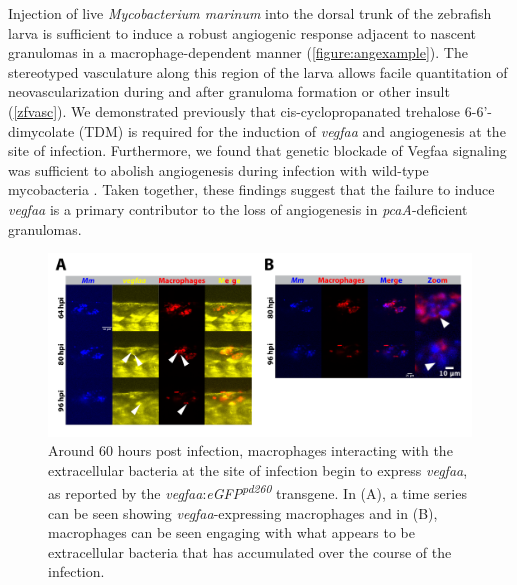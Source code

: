 Injection of live \textit{Mycobacterium marinum} into the dorsal trunk of the zebrafish larva is sufficient to induce a robust angiogenic response adjacent to nascent granulomas in a macrophage\hyp{}dependent manner \citep{Oehlers2015} (\autoref{figure:angexample}). The stereotyped vasculature along this region of the larva allows facile quantitation of neovascularization during and after granuloma formation or other insult \citep{Lawson2002, Jin2005, Gore2012, Matsuoka2018} (\autoref{zfvasc}). We demonstrated previously that cis\hyp{}cyclopropanated trehalose 6\hyp{}6'\hyp{}dimycolate (TDM) is required for the induction of \textit{vegfaa} and angiogenesis at the site of infection. Furthermore, we found that genetic blockade of Vegfaa signaling was sufficient to abolish angiogenesis during infection with wild\hyp{}type mycobacteria \citep{Walton2018}. Taken together, these findings suggest that the failure to induce \textit{vegfaa} is a primary contributor to the loss of angiogenesis in \textit{pcaA}\hyp{}deficient granulomas.

\begin{figure}
\centering
\includegraphics[width=\textwidth]{images/extracellularvegfa.pdf}
\caption{Around 60 hours post infection, macrophages interacting with the extracellular bacteria at the site of infection begin to express \textit{vegfaa}, as reported by the \textit{vegfaa}:\textit{eGFP\textsuperscript{pd260}} transgene. In (A), a time series can be seen showing \textit{vegfaa}\hyp{}expressing macrophages and in (B), macrophages can be seen engaging with what appears to be extracellular bacteria that has accumulated over the course of the infection.}
\label{figure:ecvegfa}

\end{figure}

